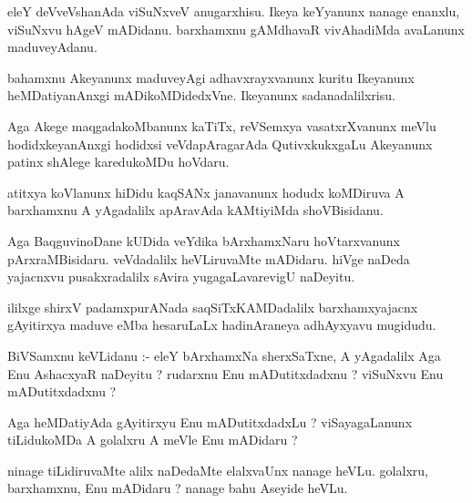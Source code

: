 \documentclass{article}
\begin{document}
\begin{mn}
eleY deVveVshanAda viSuNxveV anugarxhisu.   Ikeya  keYyanunx  nanage enanxlu, viSuNxvu  
hAgeV mADidanu.  barxhamxnu  gAMdhavaR vivAhadiMda  avaLanunx  maduveyAdanu.
\end{mn}

\begin{mn}
bahamxnu Akeyanunx maduveyAgi adhavxrayxvanunx  kuritu Ikeyanunx  heMDatiyanAnxgi 
mADikoMDidedxVne.  Ikeyanunx  sadanadalilxrisu.
\end{mn}

\begin{mn}
Aga Akege maqgadakoMbanunx  kaTiTx,  reVSemxya vasatxrXvanunx meVlu hodidxkeyanAnxgi 
hodidxsi veVdapAragarAda  QutivxkukxgaLu Akeyanunx  patinx shAlege karedukoMDu hoVdaru. 
\end{mn}

\begin{mn}
atitxya koVlanunx  hiDidu kaqSANx janavanunx hodudx koMDiruva A barxhamxnu  
A yAgadalilx apAravAda kAMtiyiMda shoVBisidanu.
\end{mn}

\begin{mn}
Aga BaqguvinoDane kUDida veYdika bArxhamxNaru hoVtarxvanunx  pArxraMBisidaru.  veVdadalilx  
heVLiruvaMte mADidaru.  hiVge naDeda  yajacnxvu pusakxradalilx  sAvira yugagaLavarevigU naDeyitu.
\end{mn}

\begin{mn}
ililxge shirxV padamxpurANada saqSiTxKAMDadalilx barxhamxyajacnx gAyitirxya 
maduve eMba hesaruLaLx hadinAraneya adhAyxyavu mugidudu.
\end{mn}




\begin{mn}
BiVSamxnu keVLidanu :- eleY bArxhamxNa  sherxSaTxne, A yAgadalilx Aga Enu AshacxyaR  
naDeyitu ?  rudarxnu Enu mADutitxdadxnu ?  viSuNxvu  Enu mADutitxdadxnu ? 
\end{mn}

\begin{mn}
Aga heMDatiyAda gAyitirxyu Enu mADutitxdadxLu ?  viSayagaLanunx  tiLidukoMDa A golalxru A meVle Enu mADidaru ?
\end{mn}

\begin{mn}
ninage tiLidiruvaMte  alilx naDedaMte  elalxvaUnx  nanage heVLu. golalxru, barxhamxnu, 
Enu mADidaru ?  nanage bahu Aseyide heVLu.
\end{mn}
\end{document}
